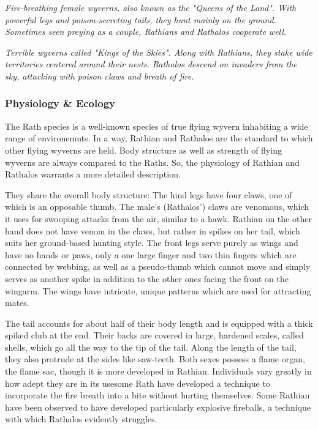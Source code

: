 \textit{Fire-breathing female wyverns, also known as the "Queens of the Land". With powerful legs and poison-secreting tails, they hunt mainly on the ground. Sometimes seen preying as a couple, Rathians and Rathalos cooperate well.}%

\textit{Terrible wyverns called "Kings of the Skies". Along with Rathians, they stake wide territories centered around their nests. Rathalos descend on invaders from the sky, attacking with poison claws and breath of fire.}\par{}%
\subsubsection{Physiology \& Ecology}
The Rath species is a well-known species of true flying wyvern inhabiting a wide range of environemnts. In a way, Rathian and Rathalos are the standard to which other flying wyverns are held. Body structure as well as strength of flying wyverns are always compared to the Raths. So, the physiology of Rathian and Rathalos warrants a more detailed description.

They share the overall body structure: The hind legs have four claws, one of which is an opposable thumb. The male's (Rathalos') claws are venomous, which it uses for swooping attacks from the air, similar to a hawk. Rathian on the other hand does not have venom in the claws, but rather in spikes on her tail, which suits her ground-based hunting style. The front legs serve purely as wings and have no hands or paws, only a one large finger and two thin fingers which are connected by webbing, as well as a pseudo-thumb which cannot move and simply serves as another spike in addition to the other ones facing the front on the wingarm. The wings have intricate, unique patterns which are used for attracting mates.

The tail accounts for about half of their body length and is equipped with a thick spiked club at the end. Their backs are covered in large, hardened scales, called shells, which go all the way to the tip of the tail. Along the length of the tail, they also protrude at the sides like saw-teeth. Both sexes possess a flame organ, the flame sac, though it is more developed in Rathian. Individuals vary greatly in how adept they are in its use\hbNone some Rath have developed a technique to incorporate the fire breath into a bite without hurting themselves. Some Rathian have been observed to have developed particularly explosive fireballs, a technique with which Rathalos evidently struggles.

